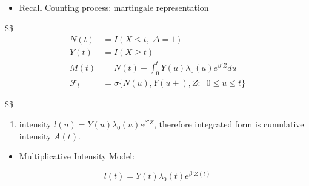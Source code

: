 \documentclass[
]{book}
\providecommand{\tightlist}{%
  \setlength{\itemsep}{0pt}\setlength{\parskip}{0pt}}
\theoremstyle{definition}
\theoremstyle{definition}
\theoremstyle{definition}
\theoremstyle{definition}
\theoremstyle{remark}
\begin{document}
\begin{itemize}
\tightlist
\item
  Recall Counting process: martingale representation
\end{itemize}

\$\$
\begin{align}

N(t) &= I(X\le t , \; \Delta = 1)
\\
Y(t) &= I(X \ge t)
\\
M(t) &= N(t) - \int_0^t Y(u)\lambda_0(u) e^{\beta ' Z } du \tag{1}
\\
\mathcal F_t &= \sigma \Big \{ N(u) , Y(u+) , Z: \; \; 0 \le u \le t \Big \}



\end{align}

\$\$

\begin{enumerate}
\def\labelenumi{\arabic{enumi})}
\tightlist
\item
  intensity \(l(u) = Y(u)\lambda_0(u) e^{\beta ' Z }\), therefore integrated form is cumulative intensity \(A(t)\).
\end{enumerate}

\begin{itemize}
\tightlist
\item
  Multiplicative Intensity Model:
\end{itemize}

\[
l(t) = Y(t)\lambda_0(t) e^{\beta ' Z(t) }
\]
\end{document}
